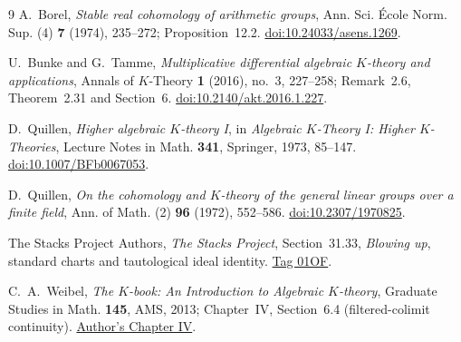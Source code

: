 \documentclass[11pt,a4paper]{article}
\theoremstyle{remark}
\begin{document}
{\small
\begin{thebibliography}{9}
A.~Borel, \emph{Stable real cohomology of arithmetic groups},
Ann. Sci. \'Ecole Norm. Sup. (4) \textbf{7} (1974), 235--272;
Proposition~12.2.
\href{https://doi.org/10.24033/asens.1269}{doi:10.24033/asens.1269}.

U.~Bunke and G.~Tamme, \emph{Multiplicative differential algebraic
\(K\)-theory and applications}, Annals of \(K\)-Theory
\textbf{1} (2016), no.~3, 227--258;
Remark~2.6, Theorem~2.31 and Section~6.
\href{https://doi.org/10.2140/akt.2016.1.227}{doi:10.2140/akt.2016.1.227}.

D.~Quillen, \emph{Higher algebraic \(K\)-theory I}, in
\emph{Algebraic \(K\)-Theory I: Higher \(K\)-Theories},
Lecture Notes in Math. \textbf{341}, Springer, 1973, 85--147.
\href{https://doi.org/10.1007/BFb0067053}{doi:10.1007/BFb0067053}.

D.~Quillen, \emph{On the cohomology and \(K\)-theory of the general
linear groups over a finite field}, Ann. of Math. (2)
\textbf{96} (1972), 552--586.
\href{https://doi.org/10.2307/1970825}{doi:10.2307/1970825}.

The Stacks Project Authors, \emph{The Stacks Project},
Section~31.33, \emph{Blowing up}, standard charts and tautological
ideal identity.
\href{https://stacks.math.columbia.edu/tag/01OF}{Tag 01OF}.

C.~A.~Weibel, \emph{The \(K\)-book: An Introduction to Algebraic
\(K\)-theory}, Graduate Studies in Math. \textbf{145}, AMS, 2013;
Chapter~IV, Section~6.4 (filtered-colimit continuity).
\href{https://sites.math.rutgers.edu/~weibel/Kbook/Kbook.IV.pdf}{Author's Chapter IV}.
\end{thebibliography}
}
\end{document}
